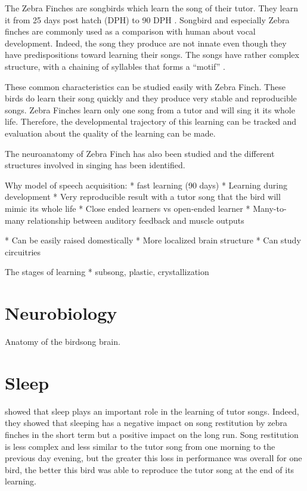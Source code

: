 \documentclass[a4paper]{report}
\begin{document}
The Zebra Finches are songbirds which learn the song of their tutor. They learn
it from 25 days post hatch (DPH) to 90 DPH \parencite{liu_juvenile_2004}.
Songbird and especially Zebra finches are commonly used as a comparison with
human about vocal development. Indeed, the song they produce are not innate
even though they have predispositions toward learning their songs. The songs
have rather complex structure, with a chaining of syllables that forms a
``motif'' \parencite{doupe_birdsong_1999, margoliash_evaluating_2002}.

These common characteristics can be studied easily with Zebra Finch. These birds
do learn their song quickly and they produce very stable and reproducible
songs. Zebra Finches learn only one song from a tutor and will sing it its whole
life. Therefore, the developmental trajectory of this learning can be tracked
and evaluation about the quality of the learning can be made.

The neuroanatomy of Zebra Finch has also been studied and the different
structures involved in singing has been identified.



Why model of speech acquisition:
* fast learning (90 days)
* Learning during development \cite{margoliash_offline_2003}
* Very reproducible result with a tutor song that the bird will mimic its whole
  life \cite{margoliash_sleep_2010}
    * Close ended learners vs open-ended learner \cite{margoliash_sleep_2010}
* Many-to-many relationship between auditory feedback and muscle outputs \cite{margoliash_offline_2003}

* Can be easily raised domestically \parencite{helekar_time_2013}
* More localized brain structure \parencite{helekar_time_2013}
    * Can study circuitries


The stages of learning
* subsong, plastic, crystallization \cite{margoliash_sleep_2010}


\section{Neurobiology}

Anatomy of the birdsong brain.

\section{Sleep}

\textcite{deregnaucourt_how_2005} showed that sleep plays an important role in
the learning of tutor songs. Indeed, they showed that sleeping has a negative
impact on song restitution by zebra finches in the short term but a positive
impact on the long run. Song restitution is less complex and less similar to the
tutor song from one morning to the previous day evening, but the greater this
loss in performance was overall for one bird, the better this bird was able to
reproduce the tutor song at the end of its learning.
\end{document}
